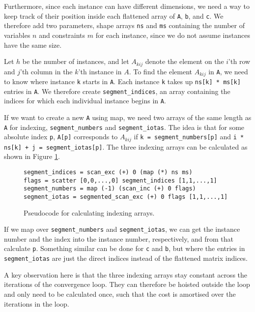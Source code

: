 Furthermore, since each instance can have different dimensions, we need a way to keep track of their position inside each flattened array of \texttt{A}, \texttt{b}, and \texttt{c}. We therefore add two parameters, shape arrays \texttt{ns} and \texttt{ms} containing the number of variables $n$ and constraints $m$ for each instance, since we do not assume instances have the same size.

\newpar
Let $h$ be the number of instances, and let $A_{kij}$ denote the element on the $i$'th row and $j$'th column in the $k$'th instance in $A$. To find the element $A_{kij}$ in \texttt{A}, we need to know where instance \texttt{k} starts in \texttt{A}. Each instance \texttt{k} takes up \texttt{ns[k] * ms[k]} entries in \texttt{A}. We therefore create \texttt{segment\_indices}, an array containing the indices for which each individual instance begins in \texttt{A}.

If we want to create a new \texttt{A} using map, we need two arrays of the same length as \texttt{A} for indexing, \texttt{segment\_numbers} and \texttt{segment\_iotas}. The idea is that for some absolute index \texttt{p}, \texttt{A[p]} corresponds to $A_{kij}$ if \texttt{k = segment\_numbers[p]} and \texttt{i * ns[k] + j = segment\_iotas[p]}. The three indexing arrays can be calculated as shown in Figure \ref{code:index}.
\begin{figure}[H]
\begin{verbatim}
segment_indices = scan_exc (+) 0 (map (*) ns ms)
flags = scatter [0,0,...,0] segment_indices [1,1,...,1]
segment_numbers = map (-1) (scan_inc (+) 0 flags)
segment_iotas = segmented_scan_exc (+) 0 flags [1,1,...,1]
\end{verbatim}
\caption{Pseudocode for calculating indexing arrays.}
\label{code:index}
\end{figure}
\noindent If we map over \texttt{segment\_numbers} and \texttt{segment\_iotas}, we can get the instance number and the index into the instance number, respectively, and from that calculate \texttt{p}. Something similar can be done for \texttt{c} and \texttt{b}, but where the entries in \texttt{segment\_iotas} are just the direct indices instead of the flattened matrix indices.

\newpar
A key observation here is that the three indexing arrays stay constant across the iterations of the convergence loop. They can therefore be hoisted outside the loop and only need to be calculated once, such that the cost is amortised over the iterations in the loop.

